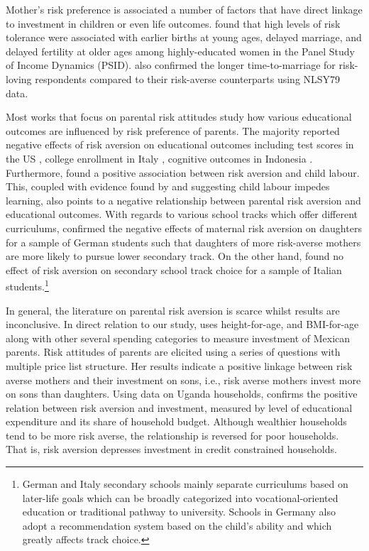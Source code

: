 \documentclass[]{article}
\begin{document}
\alert{Mother's risk preference is associated a number of factors that have direct linkage to investment in children or even life outcomes. \citet{schmidt2008risk} found that high levels of risk tolerance were associated with earlier births at young ages, delayed marriage, and delayed fertility at older ages among highly-educated women in the Panel Study of Income Dynamics (PSID). \citet{spivey2010desperation} also confirmed the longer time-to-marriage for risk-loving respondents compared to their risk-averse counterparts using NLSY79 data. }

Most works that focus on parental risk attitudes study how various educational outcomes are influenced by risk preference of parents. The majority reported negative effects of risk aversion on educational outcomes including test scores in the US \citep{brown2012parental}, college enrollment in Italy \citep{checchi2014parents}, cognitive outcomes in Indonesia \citep{hartarto2023parental}. Furthermore, \citet{frempong2021risk} found a positive association between risk aversion and child labour. This, coupled with evidence found by \citet{HEADY2003385} and \citet{bezerra2009impact} suggesting child labour impedes learning, also points to a negative relationship between parental risk aversion and educational outcomes. With regards to various school tracks which offer different curriculums, \citet{wolfel2012parental} confirmed the negative effects of maternal risk aversion on daughters for a sample of German students such that daughters of more risk-averse mothers are more likely to pursue lower secondary track. On the other hand, \citet{leonardi2007parents} found no effect of risk aversion on secondary school track choice for a sample of Italian students.\footnote{German and Italy secondary schools mainly separate curriculums based on later-life goals which can be broadly categorized into vocational-oriented education or traditional pathway to university. Schools in Germany also adopt a recommendation system based on the child's ability and which greatly affects track choice.}

In general, the literature on parental risk aversion is scarce whilst results are inconclusive. In direct relation to our study, \citet{sovero2018risk} uses height-for-age, and BMI-for-age along with other several spending categories to measure investment of Mexican parents. Risk attitudes of parents are elicited using a series of questions with multiple price list structure. Her results indicate a positive linkage between risk averse mothers and their investment on sons, i.e., risk averse mothers invest more on sons than daughters. Using data on Uganda households, \citet{tabetando2019parental} confirms the positive relation between risk aversion and investment, measured by level of educational expenditure and its share of household budget. Although wealthier households tend to be more risk averse, the relationship is reversed for poor households. That is, risk aversion depresses investment in credit constrained households.      
\end{document}

